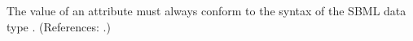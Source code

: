 The value of an  attribute must always conform to the syntax of
the SBML data type .  (References: .)
